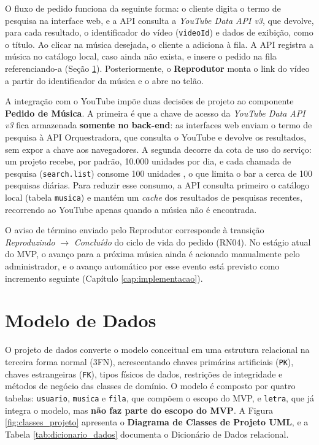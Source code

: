 O fluxo de pedido funciona da seguinte forma: o cliente digita o termo de pesquisa na interface web, e a API consulta a \textit{YouTube Data API v3}, que devolve, para cada resultado, o identificador do vídeo (\texttt{videoId}) e dados de exibição, como o título. Ao clicar na música desejada, o cliente a adiciona à fila. A API registra a música no catálogo local, caso ainda não exista, e insere o pedido na fila referenciando-a (Seção \ref{sec:modelo_dados}). Posteriormente, o \textbf{Reprodutor} monta o link do vídeo a partir do identificador da música e o abre no telão.

A integração com o YouTube impõe duas decisões de projeto ao componente \textbf{Pedido de Música}. A primeira é que a chave de acesso da \textit{YouTube Data API v3} fica armazenada \textbf{somente no back-end}: as interfaces web enviam o termo de pesquisa à API Orquestradora, que consulta o YouTube e devolve os resultados, sem expor a chave aos navegadores. A segunda decorre da cota de uso do serviço: um projeto recebe, por padrão, 10.000 unidades por dia, e cada chamada de pesquisa (\texttt{search.list}) consome 100 unidades \cite{youtubedataapi2026}, o que limita o bar a cerca de 100 pesquisas diárias. Para reduzir esse consumo, a API consulta primeiro o catálogo local (tabela \texttt{musica}) e mantém um \textit{cache} dos resultados de pesquisas recentes, recorrendo ao YouTube apenas quando a música não é encontrada.

O aviso de término enviado pelo Reprodutor corresponde à transição \textit{Reproduzindo} $\rightarrow$ \textit{Concluído} do ciclo de vida do pedido (RN04). No estágio atual do MVP, o avanço para a próxima música ainda é acionado manualmente pelo administrador, e o avanço automático por esse evento está previsto como incremento seguinte (Capítulo \ref{cap:implementacao}).

\section{Modelo de Dados} \label{sec:modelo_dados}

O projeto de dados converte o modelo conceitual em uma estrutura relacional na terceira forma normal (3FN), acrescentando chaves primárias artificiais (\texttt{PK}), chaves estrangeiras (\texttt{FK}), tipos físicos de dados, restrições de integridade e métodos de negócio das classes de domínio. O modelo é composto por quatro tabelas: \texttt{usuario}, \texttt{musica} e \texttt{fila}, que compõem o escopo do MVP, e \texttt{letra}, que já integra o modelo, mas \textbf{não faz parte do escopo do MVP}. A Figura \ref{fig:classes_projeto} apresenta o \textbf{Diagrama de Classes de Projeto UML}, e a Tabela \ref{tab:dicionario_dados} documenta o Dicionário de Dados relacional.

